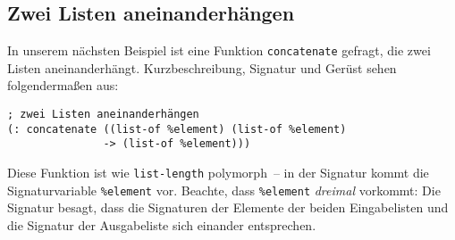 \subsection{Zwei Listen aneinanderhängen}
In unserem nächsten Beispiel ist eine Funktion
\lstinline{concatenate} gefragt, die zwei
Listen aneinanderhängt.\label{sec:concatenate}
% 
%
Kurzbeschreibung, Signatur und Gerüst sehen folgendermaßen aus:
%
\begin{lstlisting}
; zwei Listen aneinanderhängen
(: concatenate ((list-of %element) (list-of %element) 
               -> (list-of %element)))
\end{lstlisting}
%
Diese Funktion ist wie \lstinline{list-length} polymorph~-- in der
Signatur kommt die Signaturvariable \lstinline{%element} vor.
Beachte, dass \lstinline{%element} \emph{dreimal} vorkommt: Die
Signatur besagt, dass die Signaturen der Elemente der beiden
Eingabelisten und die Signatur der Ausgabeliste sich einander entsprechen.

